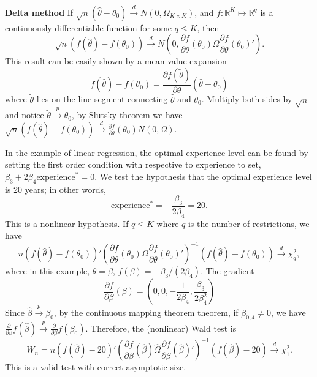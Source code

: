 \documentclass[11pt]{article}
\renewcommand{\hat}{\widehat}
\begin{document}
\textbf{Delta method} If
\(\sqrt{n}\left(\widehat{\theta}-\theta_{0}\right)\stackrel{d}{\to}N\left(0,\Omega_{K\times K}\right)\),
and \(f:\mathbb{R}^{K}\mapsto\mathbb{R}^{q}\) is a continuously
differentiable function for some \(q\leq K\), then
\[\sqrt{n}\left(f\left(\widehat{\theta}\right)-f\left(\theta_{0}\right)\right)\stackrel{d}{\to}N\left(0,\frac{\partial f}{\partial\theta}\left(\theta_{0}\right)\Omega\frac{\partial f}{\partial\theta}\left(\theta_{0}\right)'\right).\]
This result can be easily shown by a mean-value expansion
\[
f(\hat{\theta} ) - f(\theta_0) = \frac{ \partial f(\tilde{\theta}) }{\partial \theta} 
(\hat{\theta} - \theta_0)
\]
where $\tilde{\theta}$ lies on the line segment connecting $\hat{\theta}$ and $\theta_0$.
Multiply both sides by $\sqrt{n}$ and notice $\tilde{\theta} \stackrel{p}{\to} \theta_0$,
by Slutsky theorem we have 
$\sqrt{n} (f(\hat{\theta} ) - f(\theta_0) ) \stackrel{d}{\to}
\frac{\partial f}{\partial\theta}\left(\theta_{0}\right) N(0,\Omega).
 $


    In the example of linear regression, the optimal experience level can be
found by setting the first order condition with respective to experience
to set, \(\beta_{3}+2\beta_{4}\mbox{experience}^{*}=0\). We test the
hypothesis that the optimal experience level is 20 years; in other
words, \[\mbox{experience}^{*}=-\frac{\beta_{3}}{2\beta_{4}}=20.\] This
is a nonlinear hypothesis. If \(q\leq K\) where \(q\) is the number of
restrictions, we have
\[n\left(f\left(\widehat{\theta}\right)-f\left(\theta_{0}\right)\right)'\left(\frac{\partial f}{\partial\theta}\left(\theta_{0}\right)\Omega\frac{\partial f}{\partial\theta}\left(\theta_{0}\right)'\right)^{-1}\left(f\left(\widehat{\theta}\right)-f\left(\theta_{0}\right)\right)\stackrel{d}{\to}\chi_{q}^{2},\]
where in this example, \(\theta=\beta\),
\(f\left(\beta\right)=-\beta_{3}/\left(2\beta_{4}\right)\). The gradient
\[\frac{\partial f}{\partial\beta}\left(\beta\right)=\left(0,0,-\frac{1}{2\beta_{4}},\frac{\beta_{3}}{2\beta_{4}^{2}}\right)\]
Since \(\widehat{\beta}\stackrel{p}{\to}\beta_{0}\), by the continuous
mapping theorem theorem, if \(\beta_{0,4}\neq0\), we have
\(\frac{\partial}{\partial\beta}f\left(\widehat{\beta}\right)\stackrel{p}{\to}\frac{\partial}{\partial\beta}f\left(\beta_{0}\right)\).
Therefore, the (nonlinear) Wald test is
\[W_{n}=n\left(f\left(\widehat{\beta}\right)-20\right)'\left(\frac{\partial f}{\partial\beta}\left(\widehat{\beta}\right)\widehat{\Omega}\frac{\partial f}{\partial\beta}\left(\widehat{\beta}\right)'\right)^{-1}\left(f\left(\widehat{\beta}\right)-20\right)\stackrel{d}{\to}\chi_{1}^{2}.\]
This is a valid test with correct asymptotic size.
\end{document}
